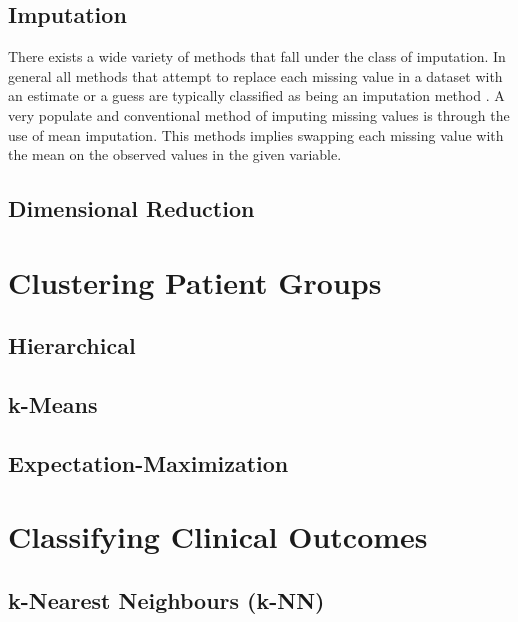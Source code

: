 \documentclass[../thesis.tex]{subfiles}
\begin{document}
\subsection{Imputation}
\label{subsec:impu}

\noindent There exists a wide variety of methods that fall under the class of imputation. In general all methods that attempt to replace each missing value in a dataset with an estimate or a guess are typically classified as being an imputation method \citep{allison1999missing}. A very populate and conventional method of imputing missing values is through the use of mean imputation. This methods implies swapping each missing value with the mean on the observed values in the given variable. 




\subsection{Dimensional Reduction}
\label{subsec:dim_red}

\section{Clustering Patient Groups}
\label{sec:cluster_pat_gro}

\subsection{Hierarchical}
\label{subsec:hierarchical}

\subsection{k-Means}
\label{subsec:k-means}

\subsection{Expectation-Maximization}
\label{subsec:em}

\section{Classifying Clinical Outcomes}
\label{sec:classify_clin_out}

\subsection{k-Nearest Neighbours (k-NN)}
\label{subsec:knn}
\end{document}
